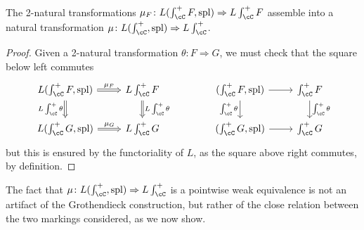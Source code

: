 \documentclass[11pt, dvipsnames]{amsart}
\begin{document}
\begin{lem}
    The 2-natural transformations $\mu_F\colon L(\int_\cC^+ F,\mathrm{spl})\Rightarrow L\int_\cC^+ F$ assemble into a natural transformation $\mu\colon L(\int_\cC^+ ,\mathrm{spl})\Rightarrow L\int_\cC^+$.
\end{lem}
\begin{proof}
   Given a 2-natural transformation $\theta\colon F\Rightarrow G$, we must check that the square below left commutes
   \[\begin{tikzcd}
       L(\int_\cC^+ F,\mathrm{spl})\rar["\mu_F", Rightarrow]\dar[Rightarrow,"L\int_\cC^+\theta"'] & L\int_\cC^+ F\dar["L\int_\cC^+\theta",Rightarrow]\\
       L(\int_\cC^+ G,\mathrm{spl})\rar["\mu_G", Rightarrow] & L\int_\cC^+ G
   \end{tikzcd}\qquad\qquad
   \begin{tikzcd}
       (\int_\cC^+ F,\mathrm{spl})\rar\dar["\int_\cC^+\theta"'] & \int_\cC^+ F\dar["\int_\cC^+\theta"]\\
       (\int_\cC^+ G,\mathrm{spl})\rar & \int_\cC^+ G
   \end{tikzcd}\] but this is ensured by the functoriality of $L$, as the square above right commutes, by definition.
\end{proof}

The fact that  $\mu\colon L(\int_\cC^+ ,\mathrm{spl})\Rightarrow L\int_\cC^+$ is a pointwise weak equivalence is not an artifact of the Grothendieck construction, but rather of the close relation between the two markings considered, as we now show. 
\end{document}
